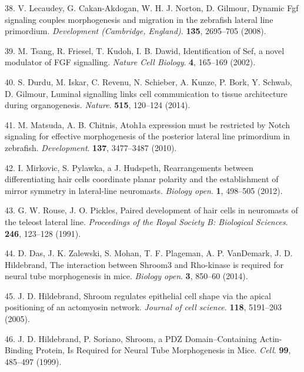 \documentclass[11pt,singlespacinge,twoside]{reedthesis} %
\theoremstyle{definition}
\theoremstyle{definition}
\theoremstyle{definition}
\theoremstyle{remark}
\begin{document}
\leavevmode\hypertarget{ref-Lecaudey2008a}{}%
38. V. Lecaudey, G. Cakan-Akdogan, W. H. J. Norton, D. Gilmour, Dynamic Fgf signaling couples morphogenesis and migration in the zebrafish lateral line primordium. \emph{Development (Cambridge, England)}. \textbf{135}, 2695--705 (2008).

\leavevmode\hypertarget{ref-Tsang}{}%
39. M. Tsang, R. Friesel, T. Kudoh, I. B. Dawid, Identification of Sef, a novel modulator of FGF signalling. \emph{Nature Cell Biology}. \textbf{4}, 165--169 (2002).

\leavevmode\hypertarget{ref-Durdu2014a}{}%
40. S. Durdu, M. Iskar, C. Revenu, N. Schieber, A. Kunze, P. Bork, Y. Schwab, D. Gilmour, Luminal signalling links cell communication to tissue architecture during organogenesis. \emph{Nature}. \textbf{515}, 120--124 (2014).

\leavevmode\hypertarget{ref-Matsuda2010b}{}%
41. M. Matsuda, A. B. Chitnis, Atoh1a expression must be restricted by Notch signaling for effective morphogenesis of the posterior lateral line primordium in zebrafish. \emph{Development}. \textbf{137}, 3477--3487 (2010).

\leavevmode\hypertarget{ref-Mirkovic2012}{}%
42. I. Mirkovic, S. Pylawka, a J. Hudspeth, Rearrangements between differentiating hair cells coordinate planar polarity and the establishment of mirror symmetry in lateral-line neuromasts. \emph{Biology open}. \textbf{1}, 498--505 (2012).

\leavevmode\hypertarget{ref-Rouse1991}{}%
43. G. W. Rouse, J. O. Pickles, Paired development of hair cells in neuromasts of the teleost lateral line. \emph{Proceedings of the Royal Society B: Biological Sciences}. \textbf{246}, 123--128 (1991).

\leavevmode\hypertarget{ref-Das2014a}{}%
44. D. Das, J. K. Zalewski, S. Mohan, T. F. Plageman, A. P. VanDemark, J. D. Hildebrand, The interaction between Shroom3 and Rho-kinase is required for neural tube morphogenesis in mice. \emph{Biology open}. \textbf{3}, 850--60 (2014).

\leavevmode\hypertarget{ref-Hildebrand2005}{}%
45. J. D. Hildebrand, Shroom regulates epithelial cell shape via the apical positioning of an actomyosin network. \emph{Journal of cell science}. \textbf{118}, 5191--203 (2005).

\leavevmode\hypertarget{ref-Hildebrand1999a}{}%
46. J. D. Hildebrand, P. Soriano, Shroom, a PDZ Domain--Containing Actin-Binding Protein, Is Required for Neural Tube Morphogenesis in Mice. \emph{Cell}. \textbf{99}, 485--497 (1999).
\end{document}
